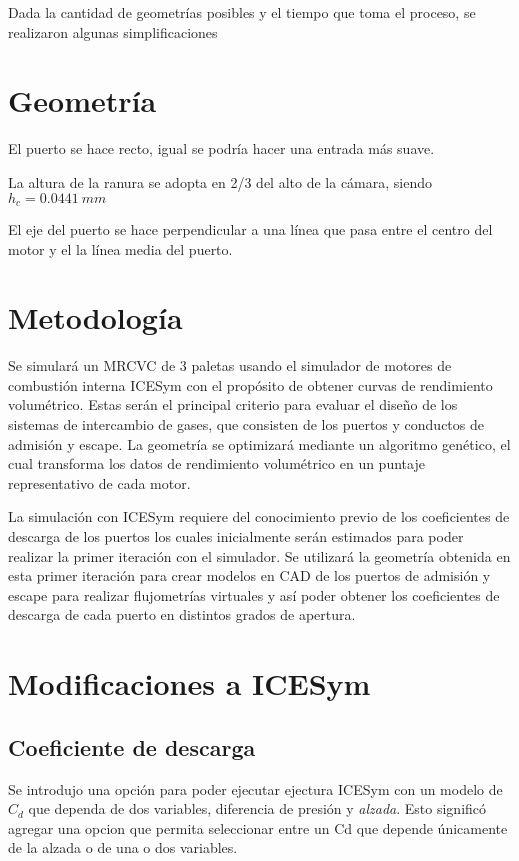 Dada la cantidad de geometrías posibles y el tiempo que toma el proceso, se
realizaron algunas simplificaciones

\section{Geometría}
%
El puerto se hace recto, igual se podría hacer una entrada más suave.

La altura de la ranura se adopta en 2/3 del alto de la cámara, siendo $h_c=0.0441\ mm$

El eje del puerto se hace perpendicular a una línea que pasa entre el centro
del motor y el la línea media del puerto.


\section{Metodología}
%
Se simulará un MRCVC de 3 paletas usando el simulador de motores de combustión
interna ICESym \cite{icesym} con el propósito de obtener curvas de rendimiento
volumétrico.
%
Estas serán el principal criterio para evaluar el diseño de los sistemas de
intercambio de gases, que consisten de los puertos y conductos de admisión y
escape.
%
La geometría se optimizará mediante un algoritmo genético, el cual transforma
los datos de rendimiento volumétrico en un puntaje representativo de cada
motor.


La simulación con ICESym requiere del conocimiento previo de los coeficientes
de descarga de los puertos los cuales inicialmente serán estimados para poder
realizar la primer iteración con el simulador.
%
Se utilizará la geometría obtenida en esta primer iteración para crear modelos
en CAD de los puertos de admisión y escape para realizar flujometrías virtuales
y así poder obtener los coeficientes de descarga de cada puerto en distintos
grados de apertura.


\section{Modificaciones a ICESym} \subsection{Coeficiente de descarga}
%
Se introdujo una opción para poder ejecutar ejectura ICESym con un modelo de
$C_d$ que dependa de dos variables, diferencia de presión y \emph{alzada}.
%
Esto significó agregar una opcion que permita seleccionar entre un Cd que
depende únicamente de la alzada o de una o dos variables.

